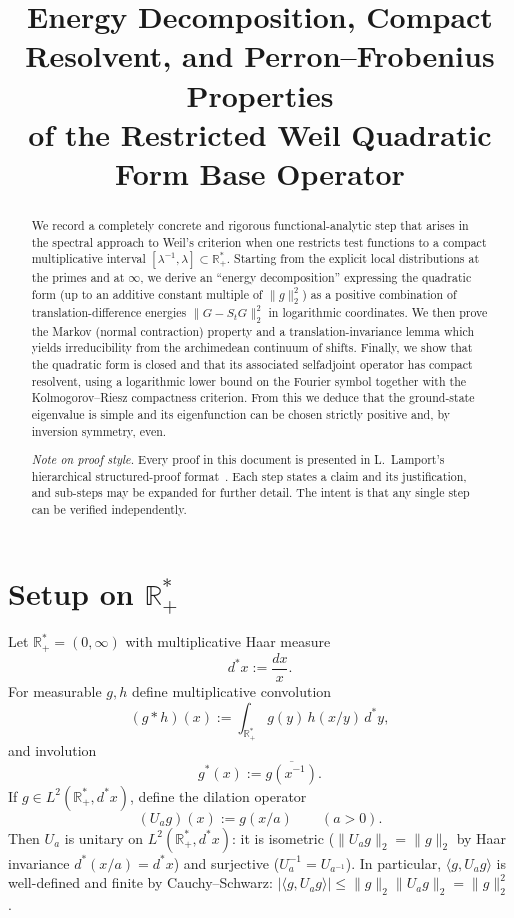 \documentclass[11pt]{article}
\title{Energy Decomposition, Compact Resolvent, and Perron--Frobenius Properties\\
of the Restricted Weil Quadratic Form Base Operator}
\author{}
\date{}
\theoremstyle{remark}
\newcommand{\R}{\mathbb R}
\newcommand{\1}{\mathbf 1}
\begin{document}
\maketitle

\begin{abstract}
We record a completely concrete and rigorous functional-analytic step that arises
in the spectral approach to Weil's criterion when one restricts test functions to
a compact multiplicative interval $[\lambda^{-1},\lambda]\subset \R_+^*$.
Starting from the explicit local distributions at the primes and at $\infty$, we
derive an ``energy decomposition'' expressing the quadratic form (up to an additive
constant multiple of $\|g\|_2^2$) as a positive combination of translation-difference
energies $\|G-S_tG\|_2^2$ in logarithmic coordinates.
We then prove the Markov (normal contraction) property and a translation-invariance
lemma which yields irreducibility from the archimedean continuum of shifts.
Finally, we show that the quadratic form is closed and that its associated
selfadjoint operator has compact resolvent, using a logarithmic lower bound on the
Fourier symbol together with the Kolmogorov--Riesz compactness criterion.
From this we deduce that the ground-state eigenvalue is simple and its
eigenfunction can be chosen strictly positive and, by inversion symmetry, even.

\medskip\noindent
\emph{Note on proof style.}  Every proof in this document is presented in
L.~Lamport's hierarchical structured-proof format~\cite{LamportHowToWrite}.
Each step states a claim and its justification, and sub-steps may be expanded
for further detail.  The intent is that any single step can be verified
independently.
\end{abstract}

\tableofcontents

\section{Setup on $\R_+^*$}

Let $\R_+^*=(0,\infty)$ with multiplicative Haar measure
\[
d^*x:=\frac{dx}{x}.
\]
For measurable $g,h$ define multiplicative convolution
\[
(g*h)(x):=\int_{\R_+^*} g(y)\,h(x/y)\,d^*y,
\]
and involution
\[
g^*(x):=\overline{g(x^{-1})}.
\]
If $g\in L^2(\R_+^*,d^*x)$, define the dilation operator
\begin{equation}
\label{eq:Ua}
(U_ag)(x):=g(x/a)\qquad(a>0).
\end{equation}
Then $U_a$ is unitary on $L^2(\R_+^*,d^*x)$: it is isometric
($\|U_ag\|_2=\|g\|_2$ by Haar invariance $d^*(x/a)=d^*x$) and surjective
($U_a^{-1}=U_{a^{-1}}$).  In particular, $\langle g,U_ag\rangle$ is
well-defined and finite by Cauchy--Schwarz:
$|\langle g,U_ag\rangle|\le\|g\|_2\|U_ag\|_2=\|g\|_2^2$.
\end{document}
